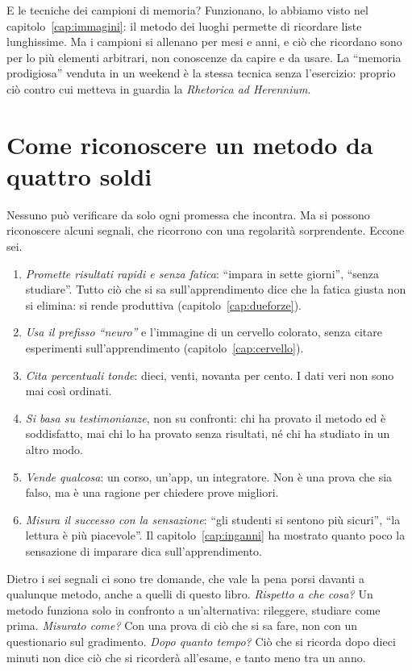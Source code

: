 E le tecniche dei campioni di memoria? Funzionano, lo abbiamo visto
nel capitolo~\ref{cap:immagini}: il metodo dei luoghi permette di
ricordare liste lunghissime. Ma i campioni si allenano per mesi e
anni, e ciò che ricordano sono per lo più elementi arbitrari, non
conoscenze da capire e da usare. La \enquote{memoria prodigiosa}
venduta in un weekend è la stessa tecnica senza l'esercizio: proprio
ciò contro cui metteva in guardia la \emph{Rhetorica ad Herennium}.

\section{Come riconoscere un metodo da quattro soldi}

Nessuno può verificare da solo ogni promessa che incontra. Ma si
possono riconoscere alcuni segnali, che ricorrono con una regolarità
sorprendente. Eccone sei.

\begin{enumerate}
  \item \emph{Promette risultati rapidi e senza fatica}: \enquote{impara
        in sette giorni}, \enquote{senza studiare}. Tutto ciò che
        si sa sull'apprendimento dice che la fatica giusta non si
        elimina: si rende produttiva (capitolo~\ref{cap:dueforze}).
  \item \emph{Usa il prefisso \enquote{neuro}} e l'immagine di un
        cervello colorato, senza citare esperimenti sull'apprendimento
        (capitolo~\ref{cap:cervello}).
  \item \emph{Cita percentuali tonde}: dieci, venti, novanta per cento.
        I dati veri non sono mai così ordinati.
  \item \emph{Si basa su testimonianze}, non su confronti: chi ha
        provato il metodo ed è soddisfatto, mai chi lo ha provato
        senza risultati, né chi ha studiato in un altro modo.
  \item \emph{Vende qualcosa}: un corso, un'app, un integratore. Non è
        una prova che sia falso, ma è una ragione per chiedere prove
        migliori.
  \item \emph{Misura il successo con la sensazione}: \enquote{gli
        studenti si sentono più sicuri}, \enquote{la lettura è più
        piacevole}. Il capitolo~\ref{cap:inganni} ha mostrato quanto
        poco la sensazione di imparare dica sull'apprendimento.
\end{enumerate}

Dietro i sei segnali ci sono tre domande, che vale la pena porsi
davanti a qualunque metodo, anche a quelli di questo libro.
\emph{Rispetto a che cosa?} Un metodo funziona solo in confronto a
un'alternativa: rileggere, studiare come prima. \emph{Misurato come?}
Con una prova di ciò che si sa fare, non con un questionario sul
gradimento. \emph{Dopo quanto tempo?} Ciò che si ricorda dopo dieci
minuti non dice ciò che si ricorderà all'esame, e tanto meno tra un
anno.


